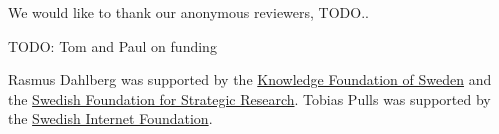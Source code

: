 We would like to thank our anonymous reviewers, TODO..

TODO: Tom and Paul on funding

Rasmus Dahlberg was supported by the \href{www.kks.se}{Knowledge Foundation of
Sweden} and the \href{https://strategiska.se/en/}{Swedish Foundation for
Strategic Research}. Tobias Pulls was supported by the
\href{https://internetstiftelsen.se/en/}{Swedish Internet Foundation}.
